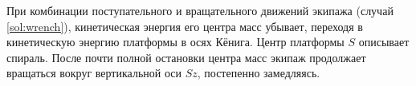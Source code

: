 При комбинации поступательного и вращательного движений экипажа (случай \ref{sol:wrench}), кинетическая энергия его центра масс убывает, переходя в кинетическую энергию платформы в осях Кёнига. Центр платформы $S$ описывает спираль. После почти полной остановки центра масс экипаж продолжает вращаться вокруг вертикальной оси $Sz$, постепенно замедляясь.

%
%

